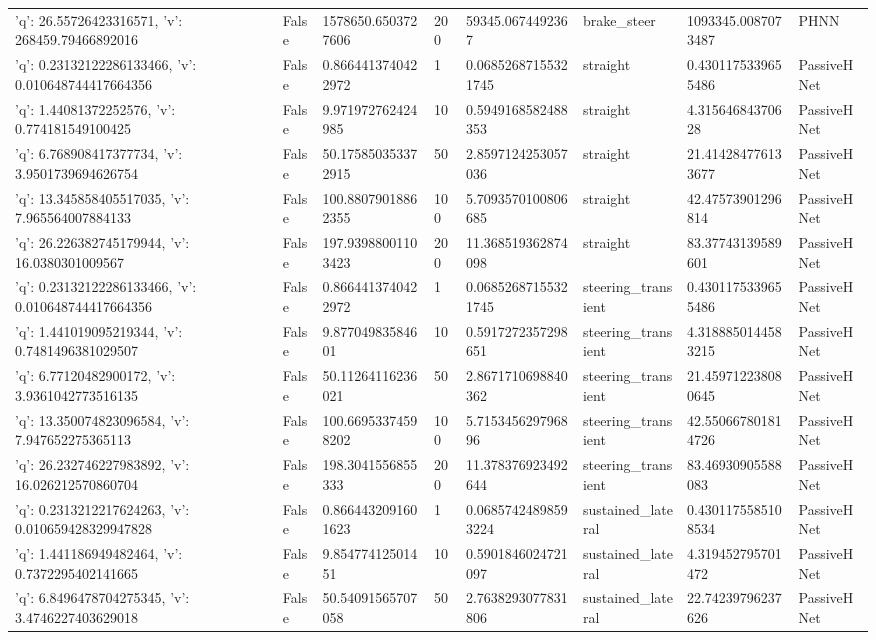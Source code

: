 \begin{tabular}{llllllll}
{'q': 26.55726423316571, 'v': 268459.79466892016} & False & 1578650.6503727606 & 200 & 59345.0674492367 & brake\_steer & 1093345.0087073487 & PHNN \\
{'q': 0.23132122286133466, 'v': 0.010648744417664356} & False & 0.8664413740422972 & 1 & 0.06852687155321745 & straight & 0.4301175339655486 & PassiveHNet \\
{'q': 1.44081372252576, 'v': 0.774181549100425} & False & 9.971972762424985 & 10 & 0.5949168582488353 & straight & 4.31564684370628 & PassiveHNet \\
{'q': 6.768908417377734, 'v': 3.9501739694626754} & False & 50.175850353372915 & 50 & 2.8597124253057036 & straight & 21.414284776133677 & PassiveHNet \\
{'q': 13.345858405517035, 'v': 7.965564007884133} & False & 100.88079018862355 & 100 & 5.7093570100806685 & straight & 42.47573901296814 & PassiveHNet \\
{'q': 26.226382745179944, 'v': 16.0380301009567} & False & 197.93988001103423 & 200 & 11.368519362874098 & straight & 83.37743139589601 & PassiveHNet \\
{'q': 0.23132122286133466, 'v': 0.010648744417664356} & False & 0.8664413740422972 & 1 & 0.06852687155321745 & steering\_transient & 0.4301175339655486 & PassiveHNet \\
{'q': 1.441019095219344, 'v': 0.7481496381029507} & False & 9.87704983584601 & 10 & 0.5917272357298651 & steering\_transient & 4.3188850144583215 & PassiveHNet \\
{'q': 6.77120482900172, 'v': 3.9361042773516135} & False & 50.11264116236021 & 50 & 2.8671710698840362 & steering\_transient & 21.459712238080645 & PassiveHNet \\
{'q': 13.350074823096584, 'v': 7.947652275365113} & False & 100.66953374598202 & 100 & 5.715345629796896 & steering\_transient & 42.550667801814726 & PassiveHNet \\
{'q': 26.232746227983892, 'v': 16.026212570860704} & False & 198.3041556855333 & 200 & 11.378376923492644 & steering\_transient & 83.46930905588083 & PassiveHNet \\
{'q': 0.2313212217624263, 'v': 0.010659428329947828} & False & 0.8664432091601623 & 1 & 0.06857424898593224 & sustained\_lateral & 0.4301175585108534 & PassiveHNet \\
{'q': 1.441186949482464, 'v': 0.7372295402141665} & False & 9.85477412501451 & 10 & 0.5901846024721097 & sustained\_lateral & 4.319452795701472 & PassiveHNet \\
{'q': 6.8496478704275345, 'v': 3.4746227403629018} & False & 50.54091565707058 & 50 & 2.7638293077831806 & sustained\_lateral & 22.74239796237626 & PassiveHNet \\

\end{tabular}
